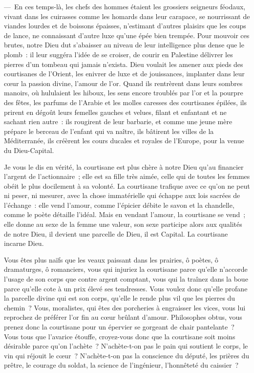 \documentclass[french,twoside]{book} %
\begin{document}
— En ces temps-là, les chefs des hommes étaient les grossiers seigneurs féodaux, vivant dans les cuirasses comme les homards dans leur carapace, se nourrissant de viandes lourdes et de boissons épaisses, n’estimant d’autres plaisirs que les coups de lance, ne connaissant d’autre luxe qu’une épée bien trempée. Pour mouvoir ces brutes, notre Dieu dut s’abaisser au niveau de leur intelligence plus dense que le plomb : il leur suggéra l’idée de se croiser, de courir en Palestine délivrer les pierres d’un tombeau qui jamais n’exista. Dieu voulait les amener aux pieds des courtisanes de l’Orient, les enivrer de luxe et de jouissances, implanter dans leur cœur la passion divine, l’amour de l’or. Quand ils rentrèrent dans leurs sombres manoirs, où hululaient les hiboux, les sens encore troublés par l’or et la pourpre des fêtes, les parfums de l’Arabie et les molles caresses des courtisanes épilées, ils prirent en dégoût leurs femelles gauches et velues, filant et enfantant et ne sachant rien autre : ils rougirent de leur barbarie, et comme une jeune mère prépare le berceau de l’enfant qui va naître, ils bâtirent les villes de la Méditerranée, ils créèrent les cours ducales et royales de l’Europe, pour la venue du Dieu-Capital.\par
Je vous le dis en vérité, la courtisane est plus chère à notre Dieu qu’au financier l’argent de l’actionnaire ; elle est sa fille très aimée, celle qui de toutes les femmes obéit le plus docilement à sa volonté. La courtisane trafique avec ce qu’on ne peut ni peser, ni mesurer, avec la chose immatérielle qui échappe aux lois sacrées de l’échange : elle vend l’amour, comme l’épicier débite le savon et la chandelle, comme le poète détaille l’idéal. Mais en vendant l’amour, la courtisane se vend ; elle donne au sexe de la femme une valeur, son sexe participe alors aux qualités de notre Dieu, il devient une parcelle de Dieu, il est Capital. La courtisane incarne Dieu.\par
Vous êtes plus naïfs que les veaux paissant dans les prairies, ô poètes, ô dramaturges, ô romanciers, vous qui injuriez la courtisane parce qu’elle n’accorde l’usage de son corps que contre argent comptant, vous qui la traînez dans la boue parce qu’elle cote à un prix élevé ses tendresses. Vous voulez donc qu’elle profane la parcelle divine qui est son corps, qu’elle le rende plus vil que les pierres du chemin ? Vous, moralistes, qui êtes des porcheries à engraisser les vices, vous lui reprochez de préférer l’or fin au cœur brûlant d’amour. Philosophes obtus, vous prenez donc la courtisane pour un épervier se gorgeant de chair pantelante ? Vous tous que l’avarice étouffe, croyez-vous donc que la courtisane soit moins désirable parce qu’on l’achète ? N'achète-t-on pas le pain qui soutient le corps, le vin qui réjouit le cœur ? N'achète-t-on pas la conscience du député, les prières du prêtre, le courage du soldat, la science de l’ingénieur, l’honnêteté du caissier ?\par
\end{document}
